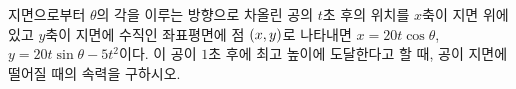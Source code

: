 지면으로부터 $\theta$의 각을 이루는 방향으로 차올린 공의 $t$초 후의 위치를 $x$축이 지면 위에 있고 $y$축이 지면에 수직인 좌표평면에 점 $(x{,}\mkern3mu\mathopen{}y)$로 나타내면 $x=20t\cos\theta$, $y=20t\sin\theta-5t^2$이다. 이 공이 $1$초 후에 최고 높이에 도달한다고 할 때, 공이 지면에 떨어질 때의 속력을 구하시오. 
